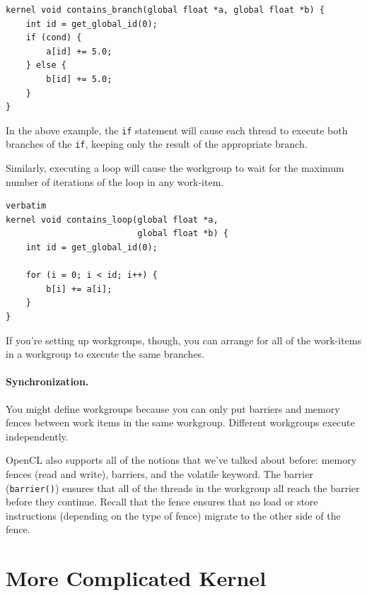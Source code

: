{\scriptsize \hspace*{2em} \begin{minipage}{.5\textwidth}
    \begin{lstlisting}
kernel void contains_branch(global float *a, global float *b) {
    int id = get_global_id(0);
    if (cond) {
        a[id] += 5.0;
    } else {
        b[id] += 5.0;
    }
}
    \end{lstlisting}
      \end{minipage}}

In the above example, the {\tt if} statement will cause
each thread to execute both branches of the {\tt if}, keeping only the
result of the appropriate branch.

Similarly, executing a loop will cause the
workgroup to wait for the maximum number of iterations of the loop in
any work-item.

{\scriptsize \hspace*{2em} \begin{minipage}{.5\textwidth}
    \begin{lstlisting}verbatim
kernel void contains_loop(global float *a, 
                          global float *b) {
    int id = get_global_id(0);
    
    for (i = 0; i < id; i++) {
        b[i] += a[i];
    }
}
    \end{lstlisting}
\end{minipage} }

If you're setting up workgroups, though, you can arrange for all
of the work-items in a workgroup to execute the same branches.

\paragraph{Synchronization.} You might define
workgroups because you can only put barriers and memory fences between
work items in the same workgroup. Different workgroups execute
independently.

OpenCL also supports all of the notions that we've talked about
before: memory fences (read and write), barriers, and the volatile
keyword.  The barrier ({\tt barrier()}) ensures that all of the
threads in the workgroup all reach the barrier before they continue.
Recall that the fence ensures that no load or store instructions
(depending on the type of fence) migrate to the other side of the fence.


\section*{More Complicated Kernel}


